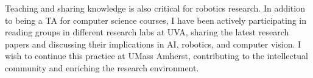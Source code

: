 \documentclass[10pt]{article}
\begin{document}
Teaching and sharing knowledge is also critical for robotics research. In addition to being a TA for computer science courses, I have been actively participating in reading groups in different research labs at UVA, sharing the latest research papers and discussing their implications in AI, robotics, and computer vision. I wish to continue this practice at UMass Amherst, contributing to the intellectual community and enriching the research environment.
\end{document}
